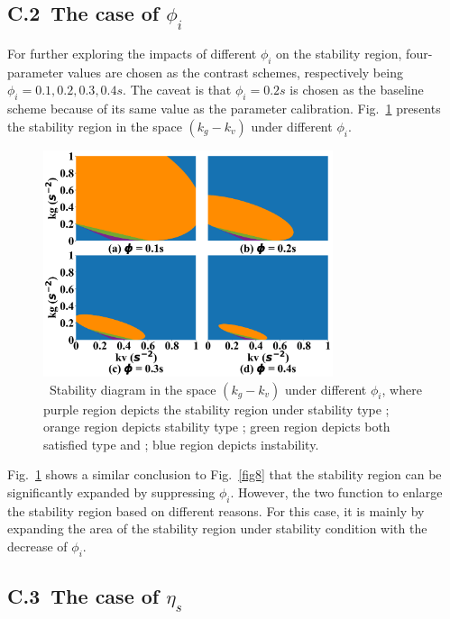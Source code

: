\documentclass[journal]{IEEEtran}
\begin{document}
\subsection*{C.2~The case of $\phi_i$}

For further exploring the impacts of different $\phi_i$ on the stability region, four-parameter values are chosen as the contrast schemes, respectively being $\phi_i=0.1,0.2,0.3,0.4s$. The caveat is that $\phi_i=0.2s$ is chosen as the baseline scheme because of its same value as the parameter calibration. Fig.~\ref{fig9} presents the stability region in the space $(k_g-k_v)$ under different $\phi_i$.

\begin{figure}
  \centering
  \includegraphics[width=8.5cm]{figs/fig9.png}
  \caption{~Stability diagram in the space $(k_g-k_v)$ under different $\phi_i$, where purple region depicts the stability region under stability type \uppercase\expandafter{}; orange region depicts stability type \uppercase\expandafter{}; green region depicts both satisfied type \uppercase\expandafter{} and \uppercase\expandafter{}; blue region depicts instability.}
  \label{fig9}
\end{figure}

Fig.~\ref{fig9} shows a similar conclusion to Fig.~\ref{fig8} that the stability region can be significantly expanded by suppressing $\phi_i$. However, the two function to enlarge the stability region based on different reasons. For this case, it is mainly by expanding the area of the stability region under stability condition \uppercase\expandafter{} with the decrease of $\phi_i$.

\subsection*{C.3~The case of $\eta_s$}
\end{document}
